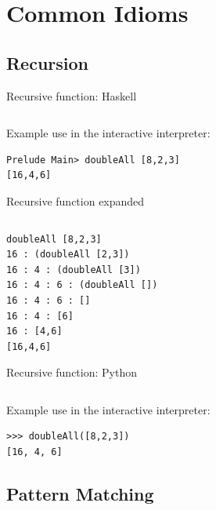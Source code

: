 \documentclass[mathserif]{beamer}
\begin{document}
\section{Common Idioms}
\subsection{Recursion}

\begin{frame}[fragile]{Recursive function: Haskell}

  \inputminted[fontsize=\Large,lastline=3]{haskell}{code/haskell/doubleall_recursion.hs}

  \vskip5mm

Example use in the interactive interpreter:
  \begin{verbatim}
Prelude Main> doubleAll [8,2,3]
[16,4,6]
  \end{verbatim}

\end{frame}

\begin{frame}[fragile]{Recursive function expanded}

  \inputminted[fontsize=\Large,firstline=2,lastline=3]{haskell}{code/haskell/doubleall_recursion.hs}

  \vskip5mm

  \begin{verbatim}
doubleAll [8,2,3]
16 : (doubleAll [2,3])
16 : 4 : (doubleAll [3])
16 : 4 : 6 : (doubleAll [])
16 : 4 : 6 : []
16 : 4 : [6]
16 : [4,6]
[16,4,6]
  \end{verbatim}

\end{frame}

\begin{frame}[fragile]{Recursive function: Python}

  \inputminted[fontsize=\large,firstline=3,lastline=9]{python}{code/python/doubleall_recursion.py}

  \vskip5mm

Example use in the interactive interpreter:

  \begin{verbatim}
>>> doubleAll([8,2,3])
[16, 4, 6]
  \end{verbatim}

\end{frame}

\subsection{Pattern Matching}
\end{document}
